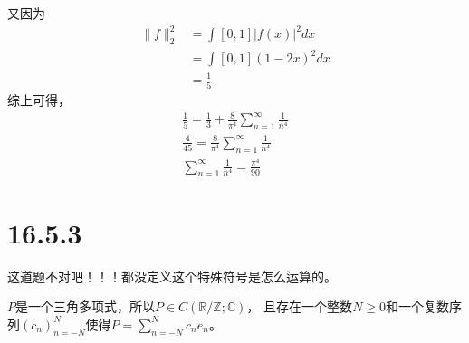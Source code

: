 \documentclass{article}
\begin{document}
\begin{itemize}
        又因为
        \begin{align*}
          \|f\|_2^2 & = \int{[0, 1]} |f(x)|^2 dx   \\
                    & = \int{[0, 1]} (1 - 2x)^2 dx \\
                    & = \frac{1}{5}
        \end{align*}
        综上可得，
        \begin{align*}
          \frac{1}{5} = \frac{1}{3} + \frac{8}{\pi^4} \sum \limits_{n = 1}^\infty \frac{1}{n^4} \\
          \frac{4}{45} = \frac{8}{\pi^4} \sum \limits_{n = 1}^\infty \frac{1}{n^4}              \\
          \sum \limits_{n = 1}^\infty \frac{1}{n^4} = \frac{\pi^4}{90}
        \end{align*}
\end{itemize}

\section*{16.5.3}

这道题不对吧！！！都没定义这个特殊符号是怎么运算的。

$P$是一个三角多项式，所以$P \in C(\mathbb{R}/\mathbb{Z}; \mathbb{C})$，
且存在一个整数$N \geq 0$和一个复数序列$(c_n)_{n = -N}^N$使得$P = \sum \limits_{n = -N}^N c_ne_n$。
\end{document}
